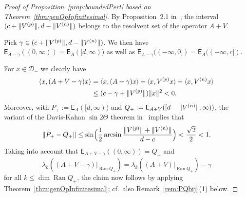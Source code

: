 \documentclass[11pt,a4paper]{amsart}
\numberwithin{equation}{section}
\DeclareMathOperator{\Ran}{Ran}
\DeclarePairedDelimiter{\norm}{\lVert}{\rVert}
\DeclarePairedDelimiter{\scprod}{\langle}{\rangle}
\newcommand{\EE}{\mathsf{E}}
\newcommand{\cD}{{\mathcal D}}
\theoremstyle{plain}
\theoremstyle{definition}
\theoremstyle{remark}
\begin{document}
\begin{proof}[Proof of Proposition~\ref{prop:boundedPert} based on Theorem~\ref{thm:genOpInfinitesimal}]
  By Proposition~2.1 in~\cite{Seel20}, the interval $(c + \norm{V^{(p)}} , d - \norm{V^{(n)}})$ belongs to the resolvent set of
  the operator $A + V$.

  Pick $\gamma \in (c + \norm{V^{(p)}} , d - \norm{V^{(n)}})$. We then have $\EE_{A-\gamma}((0,\infty)) = \EE_A([d,\infty))$ as
  well as $\EE_{A-\gamma}((-\infty,0]) = \EE_A((-\infty,c])$.

  For $x \in \cD_-$ we clearly have
  \begin{align*}
    \scprod{ x , (A+V-\gamma)x }
    &=
    \scprod{ x , (A-\gamma)x } + \scprod{ x , V^{(p)}x } - \scprod{ x , V^{(n)}x }\\
    &\le
    (c - \gamma + \norm{V^{(p)}}) \norm{x}^2
    <
    0
    .    
  \end{align*}
  Moreover, with $P_+ := \EE_A([d,\infty))$ and $Q_+ := \EE_{A+V}([d-\norm{V^{(n)}},\infty))$, the variant of the Davis-Kahan
  $\sin2\Theta$ theorem in~\cite[Theorem~1.1]{Seel20} implies that
  \begin{equation*}
  		\norm{ P_+ - Q_+ }
  		\le
  		\sin\Bigl( \frac{1}{2} \arcsin \frac{\norm{V^{(p)}} + \norm{V^{(n)}}}{d-c} \Bigr)
  		<
  		\frac{\sqrt{2}}{2}
  		<
  		1
    .
  \end{equation*}
	Taking into account that $\EE_{A+V-\gamma}((0,\infty)) = Q_+$ and
  \begin{equation*}
    \lambda_k((A+V-\gamma)|_{\Ran Q_+}) = \lambda_k((A+V)|_{\Ran Q_+}) - \gamma
  \end{equation*}
  for all $k \le \dim\Ran Q_+$, the claim now follows by applying Theorem~\ref{thm:genOpInfinitesimal}; cf.~also
  Remark~\ref{rem:PQbij}\,(1) below.
\end{proof}%
\end{document}
